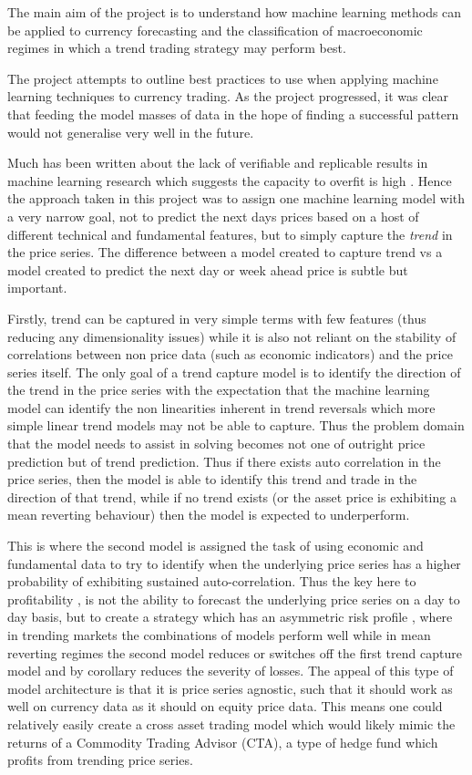 \documentclass[11pt]{article}
\begin{document}
The main aim of the project is to understand how machine learning methods can be applied to currency forecasting and the classification of macroeconomic regimes in which a trend trading strategy may perform best.
\par The project attempts to outline best practices to use when applying machine learning techniques to currency trading. As the project progressed, it was clear that feeding the model masses of data in the hope of finding a successful pattern would not generalise very well in the future. \par Much has been written about the lack of verifiable and replicable results in machine learning research which suggests the capacity to overfit is high \cite{Bartram2019}. Hence the approach taken in this project was to assign one machine learning model with a very narrow goal, not to predict the next days prices based on a host of different technical and fundamental features, but to simply capture the \textit{trend} in the price series. \newline The difference between a model created to capture trend vs a model created to predict the next day or week ahead price is subtle but important. \par Firstly, trend can be captured in very simple terms with few features (thus reducing any dimensionality issues) while it is also not reliant on the stability of correlations between non price data (such as economic indicators) and the price series itself. The only goal of a trend capture model is to identify the direction of the trend in the price series with the expectation that the machine learning model can identify the non linearities inherent in trend reversals which more simple linear trend models may not be able to capture. Thus the problem domain that the model needs to assist in solving becomes not one of outright price prediction but of trend prediction.  Thus if there exists auto correlation in the price series, then the model is able to identify this trend and trade in the direction of that trend, while if no trend exists (or the asset price is exhibiting a mean reverting behaviour) then the model is expected to underperform. \par 
This is where the second model is assigned the task of using economic and fundamental data to try to identify when the underlying price series has a higher probability of exhibiting sustained auto-correlation. Thus the key here to profitability , is not the ability to forecast the underlying price series on a day to day basis, but to create a strategy which has an asymmetric risk profile  , where in trending markets the combinations of models perform well while in mean reverting regimes the second model reduces or switches off the first trend capture model and by corollary reduces the severity of losses.
The appeal of this type of  model architecture is that it is price series agnostic, such that it should work as well on currency data as it should on equity price data. This means one could relatively easily create a cross asset trading model which would likely mimic the returns of a Commodity Trading Advisor (CTA), a type of hedge fund which profits from trending price series. 
\end{document}
